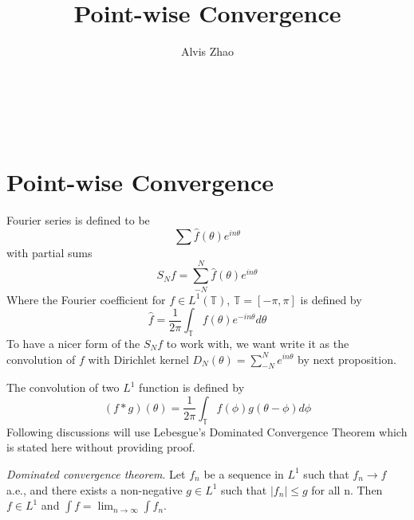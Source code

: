 \documentclass[12pt]{article}
\newenvironment{theorem}[1][Theorem.]{\begin{trivlist}
\item[\hskip \labelsep {\bfseries #1}]}{\end{trivlist}}
\begin{document}
 
\title{Point-wise Convergence}
\author{Alvis Zhao}
\makeatletter
\hfil\parbox[t]{\textwidth}{\Large\bfseries\@title\\[0.5ex]\normalsize\bfseries\@author\\[0.5ex]\@date}\par
\makeatother

\section*{Point-wise Convergence}
Fourier series is defined to be \[ \sum\limits\hat{f}(\theta)e^{in\theta}
\]
with partial sums
\[S_Nf = \sum\limits_{-N}^N\hat{f}(\theta)e^{in\theta}
\]
Where the Fourier coefficient for $f \in L^1(\mathbb{T})$, $\mathbb{T} = [-\pi,\pi ]$ is defined by \[ \hat{f} = \frac{1}{2\pi}\int_\mathbb{T}f(\theta)e^{-in\theta}d\theta\]
To have a nicer form of the $S_Nf$ to work with, we want write it as the convolution of $f$ with Dirichlet kernel $D_N(\theta)= \sum_{-N}^Ne^{in\theta}$ by next proposition.

The convolution of two $L^1$ function is defined by 
\[
(f*g)(\theta)=\frac{1}{2\pi}\int_{\mathbb{T}}f(\phi)g(\theta-\phi)d\phi
\]
Following discussions will use Lebesgue's Dominated Convergence Theorem which is stated here without providing proof.
\begin{theorem}
\textit{Dominated convergence theorem}.
Let ${f_n}$ be a sequence in $L^1$ such that $f_n \rightarrow f$ a.e., and there exists a non-negative $g\in L^1$ such that $|f_n| \leqslant g$ for all n. Then $f\in L^1$ and $\int f = \lim_{n\rightarrow \infty}\int f_n$.
\end{theorem}
\end{document}
